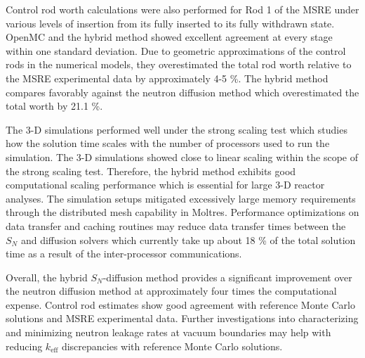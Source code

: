 Control rod worth calculations were also performed for Rod 1 of the \gls{MSRE} under various levels
of insertion from its fully inserted to its fully withdrawn state. OpenMC and the hybrid method
showed excellent agreement at every stage within one standard deviation. Due to geometric
approximations of the control rods in the numerical models, they overestimated the total
rod worth relative to the \gls{MSRE} experimental data by approximately 4-5 \%. The hybrid method
compares favorably against the neutron diffusion method which overestimated the total worth by
21.1 \%.

The 3-D simulations performed well under the strong scaling test which studies how the solution
time scales with the number of processors used to run the simulation. The 3-D simulations showed
close to linear scaling within the scope of the strong scaling test. Therefore, the hybrid method
exhibits good computational scaling performance which is essential for large 3-D reactor analyses.
The simulation setups mitigated excessively large memory requirements through the distributed mesh
capability in Moltres. Performance optimizations on data transfer and caching routines may reduce
data transfer times between the $S_N$ and diffusion solvers which currently take up about 18 \% of
the total solution time as a result of the inter-processor communications.

Overall, the hybrid $S_N$-diffusion method provides a significant improvement over the neutron
diffusion method at approximately four times the computational expense. Control rod estimates
show good agreement with reference Monte Carlo solutions and \gls{MSRE} experimental data.
Further investigations into characterizing and minimizing neutron leakage rates at vacuum
boundaries may help with reducing $k_\text{eff}$ discrepancies with reference Monte Carlo
solutions.
